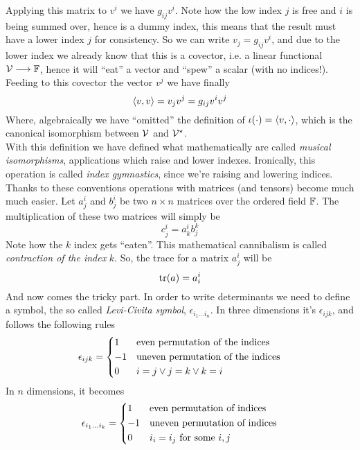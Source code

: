 \documentclass[../complete.tex]{subfiles}
\begin{document}
Applying this matrix to $v^i$ we have $g_{ij}v^i$. Note how the low index $j$ is free and $i$ is being summed over, hence is a dummy index, this means that the result must have a lower index $j$ for consistency. So we can write $v_j=g_{ij}v^i$, and due to the lower index we already know that this is a covector, i.e. a linear functional $\mathcal{V}\overset{}{\longrightarrow}\mathbb{F}$, hence it will ``eat'' a vector and ``spew'' a scalar (with no indices!). Feeding to this covector the vector $v^j$ we have finally
\begin{equation}
	\langle v, v \rangle=v_jv^j=g_{ij}v^iv^j
	\label{eq:dotproducteinsteinnot}
\end{equation}
Where, algebraically we have ``omitted'' the definition of $\iota(\cdot)=\langle v, \cdot \rangle$, which is the canonical isomorphism between $\mathcal{V}$ and $\mathcal{V}^\star$.\\
With this definition we have defined what mathematically are called \textit{musical isomorphisms}, applications which raise and lower indexes. Ironically, this operation is called \textit{index gymnastics}, since we're raising and lowering indices.
Thanks to these conventions operations with matrices (and tensors) become much much easier. Let $a^i_j$ and $b^i_j$ be two $n\times n$ matrices over the ordered field $\mathbb{F}$. The multiplication of these two matrices will simply be
\begin{equation}
	c^i_j=a^i_kb^k_j
	\label{eq:matrixprodein}
\end{equation}
Note how the $k$ index gets ``eaten''. This mathematical cannibalism is called \textit{contraction of the index} $k$. So, the trace for a matrix $a^i_j$ will be
\begin{equation}
	\trace(a)=a^i_i
	\label{eq:traceeinnot}
\end{equation}
And now comes the tricky part. In order to write determinants we need to define a symbol, the so called \textit{Levi-Civita symbol}, $\epsilon_{i_1\ldots i_n}$. In three dimensions it's $\epsilon_{ijk}$, and follows the following rules
\begin{equation}
	\epsilon_{ijk}=\begin{dcases}1&\text{even permutation of the indices}\\-1&\text{uneven permutation of the indices}\\0&i=j\vee j=k\vee k=i\end{dcases}
	\label{eq:3dlc}
\end{equation}
In $n$ dimensions, it becomes
\begin{equation}
	\epsilon_{i_1\ldots i_k}=\begin{dcases}1&\text{even permutation of indices}\\-1&\text{uneven permutation of indices}\\0&i_i=i_j\text{ for some }i,j\end{dcases}
	\label{eq:ndlc}
\end{equation}
\end{document}
